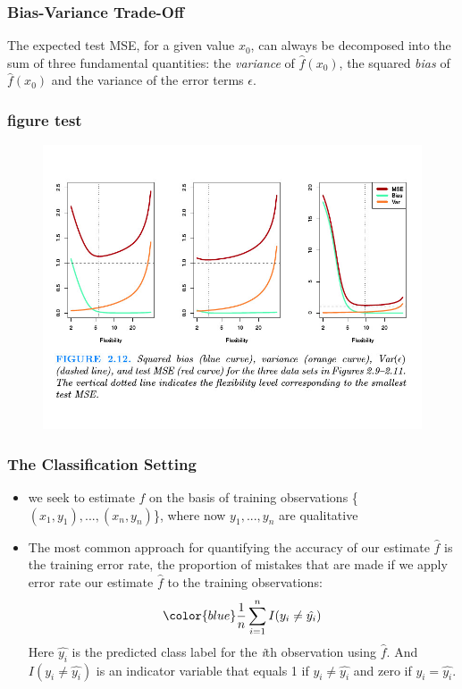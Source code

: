 \documentclass[12]{beamer}
\begin{document}
%
%
\begin{frame}
  \frametitle{Bias-Variance Trade-Off}
  The expected test MSE, for a given value $x_{0}$, can always be decomposed into the sum of three fundamental quantities: the \textit{variance} of $\hat{f}(x_{0})$, the squared \textit{bias} of $\hat{f}(x_{0})$ and the variance of the error terms $\epsilon$.
\end{frame}

\begin{frame}
  \frametitle{figure test}
  \begin{figure}[hbt!]
  \includegraphics[scale=2.0,height=0.5\paperwidth,keepaspectratio]{Untitled.jpg}
  \end{figure}
\end{frame}

\begin{frame}
  \frametitle{The Classification Setting}
  \begin{itemize}
  	\addtolength{\itemsep}{5pt}
    \item we seek to estimate $f$ on the basis of training observations
          \{$(x_{1}, y_{1}), . . . , (x_{n}, y_{n})$\}, where now $y_{1}, . . . , y_{n}$ are qualitative
    \item The most common approach for quantifying the accuracy of our estimate $\hat{f}$ is the
          training error rate, the proportion of mistakes that are made if we apply error rate our
          estimate $\hat{f}$ to the training observations:
          \begin{equation}
            \color{blue}      
	  	    \displaystyle \frac{1}{n} \sum_{i=1}^{n} I(y_{i} \neq \hat{y_{i}})
	  	  \end{equation}
	  	  Here $\hat{y_{i}}$ is the predicted class label for the \textit{i}th observation using $\hat{f}$. And
	  	  $I(y_{i} \neq \hat{y_{i}})$ is an indicator variable that equals 1 if $y_{i} \neq \hat{y_{i}}$
	  	  and zero if $y_{i} = \hat{y_{i}}$.
  \end{itemize}
\end{frame}
\end{document}
